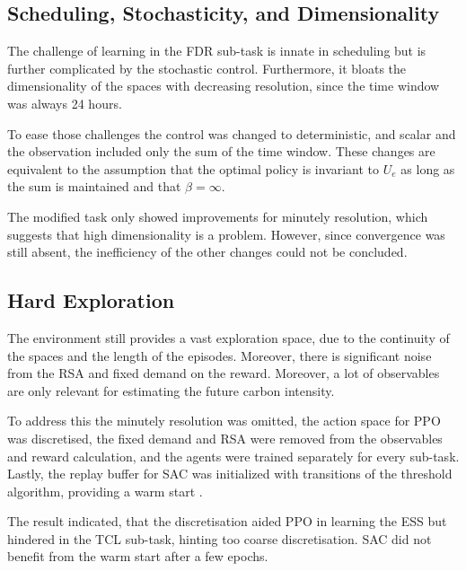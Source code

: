 \subsection{Scheduling, Stochasticity, and Dimensionality}
The challenge of learning in the FDR sub-task is innate in scheduling \cite{Zhang.23.10.2020} but is further complicated by the stochastic control. Furthermore, it bloats the dimensionality of the spaces with decreasing resolution, since the time window was always 24 hours.
\par
To ease those challenges the control was changed to deterministic, and scalar and the observation included only the sum of the time window. These changes are equivalent to the assumption that the optimal policy is invariant to $U_e$ as long as the sum is maintained and that $\beta = \infty$.
\par
The modified task only showed improvements for minutely resolution, which suggests that high dimensionality is a problem. However, since convergence was still absent, the inefficiency of the other changes could not be concluded.


\subsection{Hard Exploration}
The environment still provides a vast exploration space, due to the continuity of the spaces and the length of the episodes. Moreover, there is significant noise from the RSA and fixed demand on the reward. Moreover, a lot of observables are only relevant for estimating the future carbon intensity. 
\par
To address this the minutely resolution was omitted, the action space for PPO was discretised, the fixed demand and RSA were removed from the observables and reward calculation, and the agents were trained separately for every sub-task. Lastly, the replay buffer for SAC was initialized with transitions of the threshold algorithm, providing a warm start \cite{Wang.20.06.2023}.
\par
The result indicated, that the discretisation aided PPO in learning the ESS but hindered in the TCL sub-task, hinting too coarse discretisation. SAC did not benefit from the warm start after a few epochs. 


